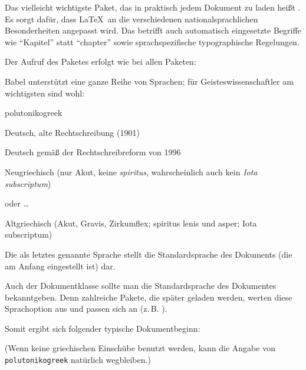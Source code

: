 
Das vielleicht wichtigste Paket, das in praktisch jedem Dokument zu laden heißt .
Es sorgt dafür, dass \LaTeX\ an die verschiedenen nationalsprachlichen Besonderheiten angepasst wird.
Das betrifft auch automatisch eingesetzte Begriffe wie \enquote{Kapitel} statt \enquote{chapter} sowie
sprachspezifische typographische Regelungen.

Der Aufruf des Paketes  erfolgt wie bei allen Paketen: 

Babel unterstützt eine ganze Reihe von Sprachen; für Geisteswissenschaftler am wichtigsten sind
wohl:

\begin{labeling}{polutonikogreek}
 \item[german] Deutsch, alte Rechtschreibung (1901)
 \item[ngerman] Deutsch gemäß der Rechtschreibreform von 1996
 \item[greek] Neugriechisch (nur Akut, keine \emph{spiritus}, wahrscheinlich auch kein \emph{Iota subscriptum})
 \item[greek.ancient] oder \ldots 
 \item[polutonikogreek] Altgriechisch (Akut, Gravis, Zirkumflex; spiritus lenis und asper; Iota subscriptum)
\end{labeling}

Die als letztes genannte Sprache stellt die Standardsprache des Dokuments (die am Anfang
eingestellt ist) dar.

Auch der Dokumentklasse sollte man die Standardsprache des Dokumentes bekanntgeben.
Denn zahlreiche Pakete, die später geladen werden, werten diese Sprachoption aus und 
passen sich an (z.\,B. ).

Somit ergibt sich folgender typische Dokumentbeginn:


(Wenn keine griechischen Einschübe benutzt werden, kann die Angabe von \lstinline/polutonikogreek/
natürlich wegbleiben.)


